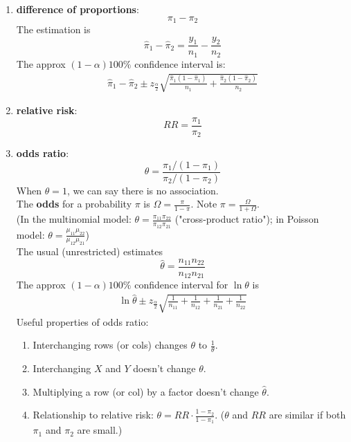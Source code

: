 \documentclass[11pt]{elegantbook}
\begin{document}
\begin{enumerate}
    \item \textbf{difference of proportions}: $$\pi_1-\pi_2$$
    The estimation is $$\hat{\pi}_1-\hat{\pi}_2=\frac{y_1}{n_1}-\frac{y_2}{n_2}$$
    The approx $(1-\alpha)100\%$ confidence interval is:
    \begin{equation}
        \begin{aligned}
            \hat{\pi}_1-\hat{\pi}_2\pm z_{\frac{\alpha}{2}}\sqrt{\frac{\hat{\pi}_1(1-\hat{\pi}_1)}{n_1}+\frac{\hat{\pi}_2(1-\hat{\pi}_2)}{n_2}}
        \end{aligned}
        \nonumber
    \end{equation}
    \item \textbf{relative risk}: $$RR=\frac{\pi_1}{\pi_2}$$
    \item \textbf{odds ratio}: $$\theta=\frac{\pi_1/(1-\pi_1)}{\pi_2/(1-\pi_2)}$$
    When $\theta=1$, we can say there is no association.\\
    The \textbf{odds} for a probability $\pi$ is $\Omega=\frac{\pi}{1-\pi}$. Note $\pi=\frac{\Omega}{1+\Omega}$.\\
    (In the multinomial model: $\theta=\frac{\pi_{11}\pi_{22}}{\pi_{12}\pi_{21}}$ ("cross-product ratio"); in Poisson model: $\theta=\frac{\mu_{11}\mu_{22}}{\mu_{12}\mu_{21}}$)\\
    The usual (unrestricted) estimates $$\hat{\theta}=\frac{n_{11}n_{22}}{n_{12}n_{21}}$$
    The approx $(1-\alpha)100\%$ confidence interval for $\ln\theta$ is
    \begin{equation}
        \begin{aligned}
            \ln\hat{\theta}\pm z_{\frac{\alpha}{2}}\sqrt{\frac{1}{n_{11}}+\frac{1}{n_{12}}+\frac{1}{n_{21}}+\frac{1}{n_{22}}}
        \end{aligned}
        \nonumber
    \end{equation}
    Useful properties of odds ratio:
    \begin{enumerate}[(1)]
        \item Interchanging rows (or cols) changes $\theta$ to $\frac{1}{\theta}$.
        \item Interchanging $X$ and $Y$ doesn't change $\theta$.
        \item Multiplying a row (or col) by a factor doesn't change $\hat{\theta}$.
        \item Relationship to relative risk: $\theta=RR\cdot\frac{1-\pi_2}{1-\pi_1}$. ($\theta$ and $RR$ are similar if both $\pi_1$ and $\pi_2$ are small.)
    \end{enumerate}
\end{enumerate}
\end{document}
